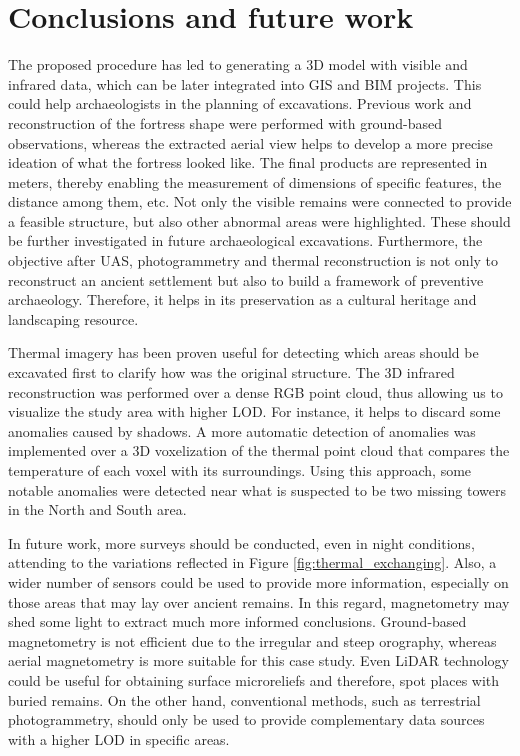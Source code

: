 \section{Conclusions and future work}

The proposed procedure has led to generating a 3D model with visible and infrared data, which can be later integrated into GIS and BIM projects. This could help archaeologists in the planning of excavations. Previous work and reconstruction of the fortress shape were performed with ground-based observations, whereas the extracted aerial view helps to develop a more precise ideation of what the fortress looked like. The final products are represented in meters, thereby enabling the measurement of dimensions of specific features, the distance among them, etc. Not only the visible remains were connected to provide a feasible structure, but also other abnormal areas were highlighted. These should be further investigated in future archaeological excavations. Furthermore, the objective after UAS, photogrammetry and thermal reconstruction is not only to reconstruct an ancient settlement but also to build a framework of preventive archaeology. Therefore, it helps in its preservation as a cultural heritage and landscaping resource. 

Thermal imagery has been proven useful for detecting which areas should be excavated first to clarify how was the original structure. The 3D infrared reconstruction was performed over a dense RGB point cloud, thus allowing us to visualize the study area with higher LOD. For instance, it helps to discard some anomalies caused by shadows. A more automatic detection of anomalies was implemented over a 3D voxelization of the thermal point cloud that compares the temperature of each voxel with its surroundings. Using this approach, some notable anomalies were detected near what is suspected to be two missing towers in the North and South area.   

In future work, more surveys should be conducted, even in night conditions, attending to the variations reflected in Figure \ref{fig:thermal_exchanging}. Also, a wider number of sensors could be used to provide more information, especially on those areas that may lay over ancient remains. In this regard, magnetometry may shed some light to extract much more informed conclusions. Ground-based magnetometry is not efficient due to the irregular and steep orography, whereas aerial magnetometry is more suitable for this case study. Even LiDAR technology could be useful for obtaining surface microreliefs and therefore, spot places with buried remains. On the other hand, conventional methods, such as terrestrial photogrammetry, should only be used to provide complementary data sources with a higher LOD in specific areas.